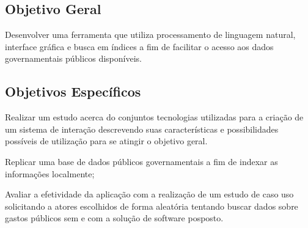 \subsection{Objetivo Geral}
Desenvolver uma ferramenta que utiliza processamento de linguagem natural, interface gráfica e busca em índices a fim de facilitar o acesso aos dados governamentais públicos disponíveis.

\subsection{Objetivos Específicos}
Realizar um estudo acerca do conjuntos tecnologias utilizadas para a criação de um sistema de interação descrevendo suas características e possibilidades possíveis de utilização para se atingir o objetivo geral.

Replicar uma base de dados públicos governamentais a fim de indexar as informações localmente;

Avaliar a efetividade da aplicação com a realização de um estudo de caso uso solicitando a atores escolhidos de forma aleatória tentando buscar dados sobre gastos públicos sem e com a solução de software posposto.
